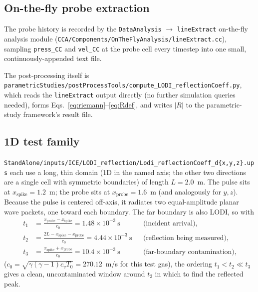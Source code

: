 \documentclass[11pt]{article}
\begin{document}
\subsection{On-the-fly probe extraction}

The probe history is recorded by the \texttt{DataAnalysis}
$\rightarrow$ \texttt{lineExtract} on-the-fly analysis module
(\texttt{CCA/\allowbreak Components/\allowbreak OnTheFlyAnalysis/\allowbreak lineExtract.cc}), sampling
\texttt{press\_CC} and \texttt{vel\_CC} at the probe cell every timestep into
one small, continuously-appended text file.

The post-processing itself is \texttt{\footnotesize parametricStudies/postProcessTools/compute\_LODI\_reflectionCoeff.py}, which reads the
\texttt{lineExtract} output directly (no further simulation queries needed),
forms Eqs.~\eqref{eq:riemann}--\eqref{eq:Rdef}, and writes $|R|$ to the
parametric-study framework's result file.

\subsection{1D test family}
\label{sec:methodology-1D}

\texttt{\footnotesize StandAlone/inputs/ICE/LODI\_reflection/Lodi\_reflectionCoeff\_d\{x,y,z\}.ups}
each use a long, thin domain (1D in the named axis; the other two directions
are a single cell with symmetric boundaries) of length $L=2.0$~m. The pulse
sits at $x_{\text{spike}}=1.2$~m; the probe sits at $x_{\text{probe}}=1.6$~m
(and analogously for $y,z$). Because the pulse is centered off-axis, it
radiates two equal-amplitude planar wave packets, one toward each boundary.
The far boundary is also LODI, so with
\begin{align}
  t_1 &= \frac{x_{\text{probe}} - x_{\text{spike}}}{c_0}
         = 1.48\times10^{-3}\ \text{s} &&\text{(incident arrival)}, \\
  t_2 &= \frac{2L - x_{\text{spike}} - x_{\text{probe}}}{c_0}
         = 4.44\times10^{-3}\ \text{s} &&\text{(reflection being measured)}, \\
  t_3 &= \frac{x_{\text{spike}} + x_{\text{probe}}}{c_0}
         = 10.4\times10^{-3}\ \text{s} &&\text{(far-boundary contamination)},
  \label{eq:timing1D}
\end{align}
($c_0 = \sqrt{\gamma(\gamma-1)c_v T_0} = 270.12$~m/s for this test gas),
the ordering $t_1 < t_2 \ll t_3$ gives a clean, uncontaminated window around
$t_2$ in which to find the reflected peak.
\end{document}
